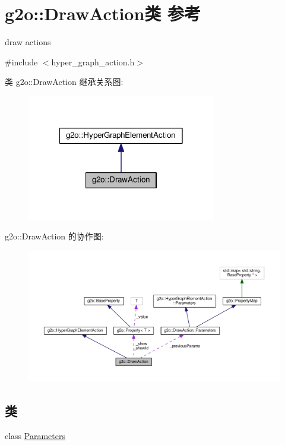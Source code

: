 \hypertarget{classg2o_1_1DrawAction}{\section{g2o\-:\-:Draw\-Action类 参考}
\label{classg2o_1_1DrawAction}
}


draw actions  




{\ttfamily \#include $<$hyper\-\_\-graph\-\_\-action.\-h$>$}



类 g2o\-:\-:Draw\-Action 继承关系图\-:
\nopagebreak
\begin{figure}[H]
\begin{center}
\leavevmode
\includegraphics[width=234pt]{classg2o_1_1DrawAction__inherit__graph}
\end{center}
\end{figure}


g2o\-:\-:Draw\-Action 的协作图\-:
\nopagebreak
\begin{figure}[H]
\begin{center}
\leavevmode
\includegraphics[width=350pt]{classg2o_1_1DrawAction__coll__graph}
\end{center}
\end{figure}
\subsection*{类}
\begin{DoxyCompactItemize}
\item 
class \hyperlink{classg2o_1_1DrawAction_1_1Parameters}{Parameters}
\end{DoxyCompactItemize}
